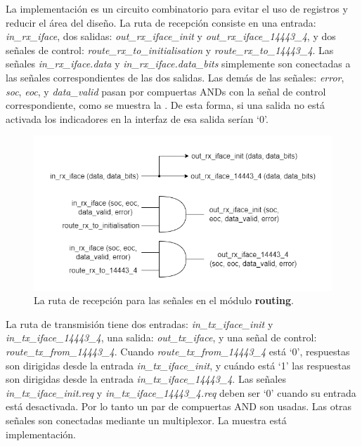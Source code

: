 \documentclass[a4paper, twoside, 11pt]{report}
\begin{document}
La implementación es un circuito combinatorio para evitar el uso de registros y reducir el área del diseño. La ruta de recepción consiste en una entrada: \textit{in\_rx\_iface}, dos salidas: \textit{out\_rx\_iface\_init} y \textit{out\_rx\_iface\_14443\_4}, y dos señales de control: \textit{route\_rx\_to\_initialisation} y \textit{route\_rx\_to\_14443\_4}. Las señales \textit{in\_rx\_iface.data} y \textit{in\_rx\_iface.data\_bits} simplemente son conectadas a las señales correspondientes de las dos salidas. Las demás de las señales: \textit{error}, \textit{soc}, \textit{eoc}, y \textit{data\_valid} pasan por compuertas ANDs con la señal de control correspondiente, como se muestra la . De esta forma, si una salida no está activada los indicadores en la interfaz de esa salida serían ‘0’.

\begin{figure}[htb]
  \centering
  \includegraphics[width=1.0\textwidth]{./img/routing_rx.drawio}
  \caption{La ruta de recepción para las señales en el módulo \textbf{routing}.}
  \label{fig:routing_rx}
\end{figure}

La ruta de transmisión tiene dos entradas: \textit{in\_tx\_iface\_init} y \textit{in\_tx\_iface\_14443\_4}, una salida: \textit{out\_tx\_iface}, y una señal de control: \textit{route\_tx\_from\_14443\_4}. Cuando \textit{route\_tx\_from\_14443\_4} está ‘0’, respuestas son dirigidas desde la entrada \textit{in\_tx\_iface\_init}, y cuándo está ‘1’ las respuestas son dirigidas desde la entrada \textit{in\_tx\_iface\_14443\_4}. Las señales \textit{in\_tx\_iface\_init.req} y \textit{in\_tx\_iface\_14443\_4.req} deben ser ‘0’ cuando su entrada está desactivada. Por lo tanto un par de compuertas AND son usadas. Las otras señales son conectadas mediante un multiplexor. La  muestra está implementación.
\end{document}
